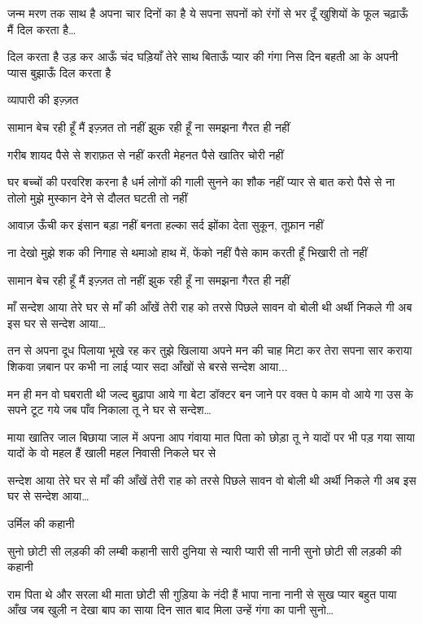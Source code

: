 जन्म मरण तक साथ है अपना
चार दिनों का है ये सपना
सपनों को रंगों से भर दूँ
खुशियों के फूल चढ़ाऊँ मैं
दिल करता है…

दिल करता है उड़ कर आऊँ
चंद घड़ियाँ तेरे साथ बिताऊँ
प्यार की गंगा निस दिन बहती
आ के अपनी प्यास बुझाऊँ
दिल करता है

व्यापारी की इज़्ज़त

सामान बेच रही हूँ मैं इज़्ज़त तो नहीं
झुक रही हूँ ना समझना गैरत ही नहीं

गरीब शायद पैसे से शराफ़त से नहीं
करती मेहनत पैसे खातिर चोरी नहीं

घर बच्चों की परवरिश करना है धर्म
लोगों की गाली सुनने का शौक नहीं
प्यार से बात करो पैसे से ना तोलो मुझे
मुस्कान देने से दौलत घटती तो नहीं

आवाज़ ऊँची कर इंसान बड़ा नहीं बनता
हल्का सर्द झोंका देता सुकून, तूफ़ान नहीं

ना देखो मुझे शक की निगाह से
थमाओ हाथ में, फेंको नहीं पैसे
काम करती हूँ भिखारी तो नहीं


सामान बेच रही हूँ मैं इज़्ज़त तो नहीं
झुक रही हूँ ना समझना गैरत ही नहीं

माँ
सन्देश आया तेरे घर से
माँ की आँखें तेरी राह को तरसे
पिछले सावन वो बोली थी
अर्थी निकले गी अब इस घर से
सन्देश आया…

तन से अपना दूध पिलाया
भूखे रह कर तुझे खिलाया
अपने मन की चाह मिटा कर
तेरा सपना सार कराया
शिकवा ज़बान पर कभी ना लाई
प्यार सदा आँखों से बरसे
सन्देश आया...

मन ही मन वो घबराती थी
जल्द बुढ़ापा आये गा
बेटा डॉक्टर बन जाने पर
वक्त पे काम वो आये गा
उस के सपने टूट गये जब
पाँव निकाला तू ने घर से
सन्देश…






माया खातिर जाल बिछाया
जाल में अपना आप गंवाया
मात पिता को छोड़ा तू ने
यादों पर भी पड़ गया साया
यादों के वो महल हैं खाली
महल निवासी निकले घर से





सन्देश आया तेरे घर से
माँ की आँखें तेरी राह को तरसे
पिछले सावन वो बोली थी
अर्थी निकले गी अब इस घर से
सन्देश आया…

उर्मिल की कहानी

सुनो छोटी सी लड़की की लम्बी कहानी
सारी दुनिया से न्यारी प्यारी सी नानी
सुनो छोटी सी लड़की की कहानी






राम पिता थे और सरला थी माता
छोटी सी गुड़िया के नंदी हैं भापा
नाना नानी से सुख प्यार बहुत पाया
आँख जब खुली न देखा बाप का साया
दिन सात बाद मिला उन्हें गंगा का पानी
सुनो…





